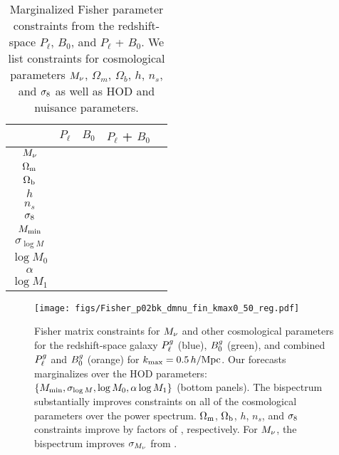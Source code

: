 \begin{table}
    \caption{Marginalized Fisher parameter constraints from the redshift-space 
    $P_\ell$, $B_0$, and $P_\ell$ + $B_0$. We list constraints for cosmological 
    parameters $M_\nu$, $\Omega_m$, $\Omega_b$, $h$, $n_s$, and $\sigma_8$ as well 
    as HOD and nuisance parameters.} 
\begin{center} 
    \begin{tabular}{ccccc} \toprule
            & $P_\ell$ & $B_0$ & $P_\ell$ + $B_0$ \\[3pt]
\hline 
$M_\nu$     & & & \\
$\Omega_{\rm m}$       & & & \\
$\Omega_{\rm b}$       & & & \\
$h$         & & & \\
$n_s$       & & & \\
$\sigma_8$      & & & \\\hline
$M_{\rm min}$       & & & \\
$\sigma_{\log M}$   & & & \\ 
$\log M_0$          & & & \\
$\alpha$            & & & \\ 
$\log M_1$          & & & \\ [3pt]
\hline            
\end{tabular} \label{tab:forecast}
\end{center}
\end{table}

\begin{figure}
    \begin{center}
        \texttt{[image: figs/Fisher\_p02bk\_dmnu\_fin\_kmax0\_50\_reg.pdf]}
        \caption{Fisher matrix constraints for $M_\nu$ and other cosmological
        parameters for the redshift-space galaxy $P^g_{\ell}$ (blue), $B^g_0$
        (green), and combined $P^g_{\ell}$ and $B^g_0$ (orange) for $k_{\rm max} =
        0.5\,h/\mathrm{Mpc}$. Our forecasts marginalizes over the \cite{zheng2007}
        HOD parameters: $\{M_{\rm min}, \sigma_{\log M}, \log M_0, \alpha \log
        M_1 \}$ (bottom panels). The bispectrum substantially improves
        constraints on all of the cosmological parameters over the power
        spectrum. $\Omega_{\rm m}$, $\Omega_{\rm b}$, $h$, $n_s$, and $\sigma_8$ constraints improve by factors
        of , respectively. For $M_\nu$, the
        bispectrum improves $\sigma_{M_\nu}$ from .
        }
        \label{fig:forecast}
    \end{center}
\end{figure}

